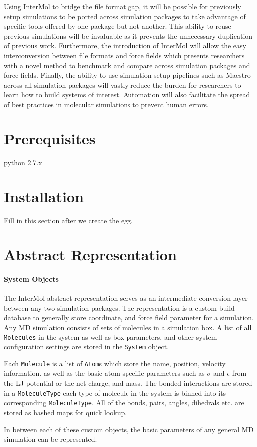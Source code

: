 \documentclass[10pt]{book}
\begin{document}
\par Using InterMol to bridge the file format gap, it will be possible for previously setup simulations to be ported across simulation packages to take advantage of specific tools offered by one package but not another. This ability to reuse previous simulations will be invaluable as it prevents the unnecessary duplication of previous work. Furthermore, the introduction of InterMol will allow the easy interconversion between file formats and force fields which presents researchers with a novel method to benchmark and compare across simulation packages and force fields. Finally, the ability to use simulation setup pipelines such as Maestro across all simulation packages will vastly reduce the burden for researchers to learn how to build systems of interest. Automation will also facilitate the spread of best practices in molecular simulations to prevent human errors.


\section{Prerequisites}

\par python 2.7.x

\section{Installation}

\par Fill in this section after we create the egg.

\section{Abstract Representation}

\paragraph{System Objects} The InterMol abstract representation serves as an intermediate conversion layer between any two simulation packages. The representation is a custom build database to generally store coordinate, and force field parameter for a simulation. Any MD simulation consists of sets of molecules in a simulation box. A list of all \texttt{Molecules} in the system as well as box parameters, and other system configuration settings are stored in the \texttt{System} object. 

\par Each \texttt{Molecule} is a list of \texttt{Atom}s which store the name, position, velocity information. as well as the basic atom specific parameters such as $\sigma$ and $\epsilon$ from the LJ-potential or the net charge, and mass. The bonded interactions are stored in a \texttt{MoleculeType} each type of molecule in the system is binned into its corresponding \texttt{MoleculeType}. All of the bonds, pairs, angles, dihedrals etc. are stored as hashed maps for quick lookup. 

\par In between each of these custom objects, the basic parameters of any general MD simulation can be represented.


\printbibliography
\end{document}
